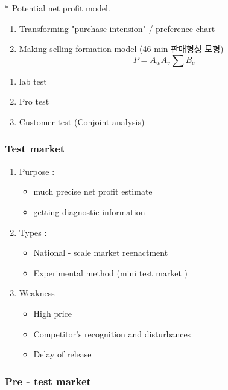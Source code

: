 \documentclass[12pt]{article}
\begin{document}
 * Potential net profit model.

\begin{enumerate}
	\item Transforming "purchase intension" / preference chart
	\item Making selling formation model (46 min 판매형성 모형)
	\[
	 P = A_w A_v \sum B_c
	\]
\end{enumerate}
\begin{enumerate}
	\item lab test
	\item Pro test
	\item Customer test (Conjoint analysis)
\end{enumerate}

\subsubsection{Test market}

\begin{enumerate}
	\item Purpose : \begin{itemize}
		\item much precise net profit estimate
		\item getting diagnostic information
	\end{itemize}
	\item Types : \begin{itemize}
		\item National - scale market reenactment
		\item Experimental method (mini test market )
	\end{itemize}
	\item Weakness \begin{itemize}
		\item High price
		\item Competitor's recognition and disturbances
		\item Delay of release
	\end{itemize}
\end{enumerate}

\subsubsection{Pre - test market}
\end{document}
